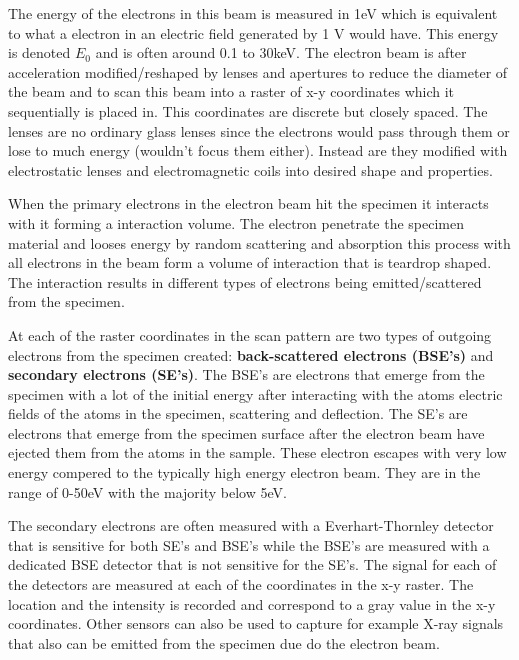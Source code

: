The energy of the electrons in this beam is measured in 1eV which is equivalent to what a electron in an electric field generated by 1 V would have. This energy is denoted $E_0$ and is often around 0.1 to 30keV. The electron beam is after acceleration modified/reshaped by lenses and apertures to reduce the diameter of the beam and to scan this beam into a raster of x-y coordinates which it sequentially is placed in. This coordinates are discrete but closely spaced. The lenses are no ordinary glass lenses since the electrons would pass through them or lose to much energy (wouldn't focus them either). Instead are they modified with electrostatic lenses and electromagnetic coils into desired shape and properties. 

When the primary electrons in the electron beam hit the specimen it interacts with it forming a interaction volume. The electron penetrate the specimen material and looses energy by random scattering and absorption this process with all electrons in the beam form a volume of interaction that is teardrop shaped. The interaction results in different types of electrons being emitted/scattered from the specimen. 

At each of the raster coordinates in the scan pattern are two types of outgoing electrons from the specimen created: \textbf{back-scattered electrons (BSE's)} and \textbf{secondary electrons (SE's)}. The BSE's are electrons that emerge from the specimen with a lot of the initial energy after interacting with the atoms electric fields of the atoms in the specimen, scattering and deflection. The SE's are electrons that emerge from the specimen surface after the electron beam have ejected them from the atoms in the sample. These electron escapes with very low energy compered to the typically high energy electron beam. They are in the range of 0-50eV with the majority below 5eV. 


The secondary electrons are often measured with a Everhart-Thornley detector that is sensitive for both SE's and BSE's while the BSE's are measured with a dedicated BSE detector that is not sensitive for the SE's. The signal for each of the detectors are measured at each of the coordinates in the x-y raster. The location and the intensity is recorded and correspond to a gray value in the x-y coordinates. Other sensors can also be used to capture for example X-ray signals that also can be emitted from the specimen due do the electron beam. 


